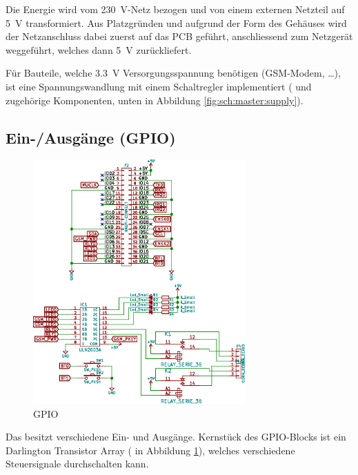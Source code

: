 Die  Energie wird  vom  \SI{230}{\volt}-Netz bezogen  und  von einem  externen
Netzteil auf \SI{5}{\volt} transformiert. Aus  Platzgr\"unden und aufgrund der
Form des Geh\"auses wird der Netzanschluss dabei zuerst auf das PCB gef\"uhrt,
anschliessend  zum   Netzger\"at  weggef\"uhrt,  welches   dann  \SI{5}{\volt}
zur\"uckliefert.

F\"ur   Bauteile,  welche   \SI{3.3}{\volt}  Versorgungsspannung   ben\"otigen
(GSM-Modem,  \ldots),  ist  eine   Spannungswandlung  mit  einem  Schaltregler
implementiert  ( und  zugeh\"orige Komponenten,  unten in  Abbildung
\ref{fig:sch:master:supply}).



\clearpage
\subsection{Ein-/Ausg\"ange (GPIO)}
\label{subsec:hw:master:gpio}

\begin{figure}[h!t]
    \centering
    \includegraphics[width=0.725\textwidth]{images/superv-sch/supervisor--sch--gpio.eps}
    \caption{GPIO \Master}
    \label{fig:sch:master:gpio}
\end{figure}

Das  \Master   besitzt  verschiedene  Ein-  und   Ausg\"ange. Kernst\"uck  des
GPIO-Blocks  ist  ein Darlington  Transistor  Array  ( in  Abbildung
\ref{fig:sch:master:gpio}),  welches verschiedene  Steuersignale durchschalten
kann.

